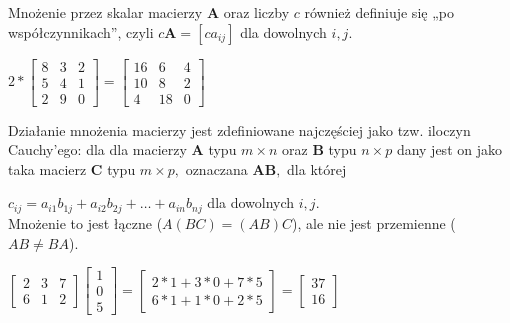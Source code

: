 \documentclass[a4paper,12pt,oneside]{book}
\begin{document}
	Mnożenie przez skalar macierzy $\mathbf{A}$ oraz liczby $c$ również definiuje się „po współczynnikach”, czyli $c\mathbf {A} =[ca_{ij}]$ dla dowolnych $ i,j.$\\
	\begin{center}
		$ 2 * \begin{bmatrix}
			8 & 3 & 2 \\
			5 & 4 & 1 \\
			2 & 9 & 0 
		\end{bmatrix} = 
	\begin{bmatrix}
		16 & 6 & 4 \\
		10 & 8 & 2 \\
		4 & 18 & 0 
	\end{bmatrix}$
	\end{center}

	Działanie mnożenia macierzy jest zdefiniowane najczęściej jako tzw. iloczyn Cauchy'ego: dla dla macierzy ${\mathbf  A}$ typu $m\times n$ oraz $\mathbf{B}$ typu $n \times p$ dany jest on jako taka macierz $\mathbf C$ typu $m\times p,$ oznaczana $\mathbf {AB} ,$ dla której
	
	$c_{ij}=a_{i1}b_{1j}+a_{i2}b_{2j}+\dots +a_{in}b_{nj}$ dla dowolnych $i,j.$\\
	
	Mnożenie to jest łączne ($A(BC)=(AB)C$), ale nie jest przemienne ($AB \neq BA$).\\
	
		\begin{center}
		$\begin{bmatrix}
			2 & 3 & 7 \\
			6 & 1 & 2 
		\end{bmatrix} 
		\begin{bmatrix}
			1 \\
			0\\
			5 
		\end{bmatrix} = 
		\begin{bmatrix}
		2 * 1 + 3 * 0 + 7 * 5\\
		6 * 1 + 1 * 0 + 2 * 5
	\end{bmatrix}=
	\begin{bmatrix}
		37\\
		16
	\end{bmatrix}$
	\end{center}
	
	
	
\end{document}
